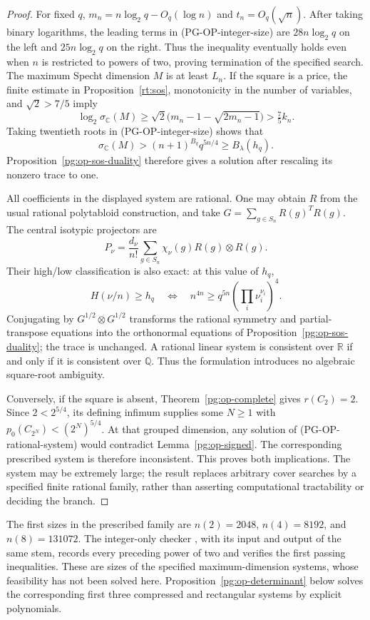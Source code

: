 \begin{proof}
For fixed $q$, $m_n=n\log_2q-O_q(\log n)$ and $t_n=O_q(\sqrt n)$.
After taking binary logarithms, the leading terms in
(PG-OP-integer-size) are $28n\log_2q$ on the left and
$25n\log_2q$ on the right. Thus the inequality eventually holds even
when $n$ is restricted to powers of two, proving termination of the
specified search. The maximum Specht dimension $M$ is at least $L_n$.
If the square is a price, the finite estimate in
Proposition~\ref{rt:sos}, monotonicity in the number of variables, and
$\sqrt2>7/5$ imply
\[
 \log_2\sigma_{\mathbb C}(M)
 \geq\sqrt2\bigl(m_n-1-\sqrt{2m_n-1}\bigr)
 >\tfrac75 k_n.
\]
Taking twentieth roots in (PG-OP-integer-size) shows that
\[
 \sigma_{\mathbb C}(M)>(n+1)^{B_q}q^{5n/4}
             \geq B_\lambda(h_q).
\]
Proposition~\ref{pg:op-sos-duality} therefore gives a solution after
rescaling its nonzero trace to one.

All coefficients in the displayed system are rational. One may obtain
$R$ from the usual rational polytabloid construction, and take
$G=\sum_{g\in S_n}R(g)^TR(g)$. The central isotypic projectors are
\[
 P_\nu=\frac{d_\nu}{n!}\sum_{g\in S_n}
       \chi_\nu(g)R(g)\otimes R(g).
\]
Their high/low classification is also exact: at this value of $h_q$,
\[
 H(\nu/n)\geq h_q
 \quad\Longleftrightarrow\quad
 n^{4n}\geq q^{5n}\left(\prod_i\nu_i^{\nu_i}\right)^4.
\]
Conjugating by $G^{1/2}\otimes G^{1/2}$ transforms the rational
symmetry and partial-transpose equations into the orthonormal equations
of Proposition~\ref{pg:op-sos-duality}; the trace is unchanged. A
rational linear system is consistent over $\mathbb R$ if and only if it
is consistent over $\mathbb Q$. Thus the formulation introduces no
algebraic square-root ambiguity.

Conversely, if the square is absent, Theorem~\ref{pg:op-complete}
gives $r(C_2)=2$. Since $2<2^{5/4}$, its defining infimum supplies
some $N\geq1$ with $p_0(C_{2^N})<(2^N)^{5/4}$. At that grouped
dimension, any solution of (PG-OP-rational-system) would contradict
Lemma~\ref{pg:op-signed}. The corresponding prescribed system is
therefore inconsistent. This proves both implications. The system may
be extremely large; the result replaces arbitrary cover searches by a
specified finite rational family, rather than asserting computational
tractability or deciding the branch.
\end{proof}

The first sizes in the prescribed family are
$n(2)=2048$, $n(4)=8192$, and $n(8)=131072$. The integer-only checker
, with its input and output
of the same stem, records every preceding power of two and verifies the
first passing inequalities. These are sizes of the specified maximum-dimension systems, whose
feasibility has not been solved here. Proposition~\ref{pg:op-determinant}
below solves the corresponding first three compressed and rectangular
systems by explicit polynomials.


